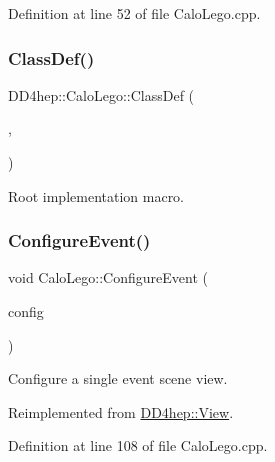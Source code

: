 Definition at line 52 of file Calo\+Lego.\+cpp.

\hypertarget{class_d_d4hep_1_1_calo_lego_a1a4c9c092acfa08adb65b7fe594fa7fd}{}\label{class_d_d4hep_1_1_calo_lego_a1a4c9c092acfa08adb65b7fe594fa7fd} 
\subsubsection{\texorpdfstring{Class\+Def()}{ClassDef()}}
{\footnotesize\ttfamily D\+D4hep\+::\+Calo\+Lego\+::\+Class\+Def (\begin{DoxyParamCaption}\item[{\hyperlink{class_d_d4hep_1_1_calo_lego}{Calo\+Lego}}]{,  }\item[{0}]{ }\end{DoxyParamCaption})}



Root implementation macro. 

\hypertarget{class_d_d4hep_1_1_calo_lego_a997e3fea32d37374ef4c6c95e087af9c}{}\label{class_d_d4hep_1_1_calo_lego_a997e3fea32d37374ef4c6c95e087af9c} 
\subsubsection{\texorpdfstring{Configure\+Event()}{ConfigureEvent()}}
{\footnotesize\ttfamily void Calo\+Lego\+::\+Configure\+Event (\begin{DoxyParamCaption}\item[{const \hyperlink{class_d_d4hep_1_1_display_configuration_1_1_view_config}{Display\+Configuration\+::\+View\+Config} \&}]{config }\end{DoxyParamCaption})\hspace{0.3cm}{\ttfamily [virtual]}}



Configure a single event scene view. 



Reimplemented from \hyperlink{class_d_d4hep_1_1_view_a655dc004a93ab9caa56ee5a501bf492f}{D\+D4hep\+::\+View}.



Definition at line 108 of file Calo\+Lego.\+cpp.



